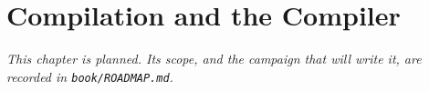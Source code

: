\chapter{Compilation and the Compiler}
\label{ch:compilation}

\emph{This chapter is planned. Its scope, and the campaign that will write
it, are recorded in \texttt{book/ROADMAP.md}.}
